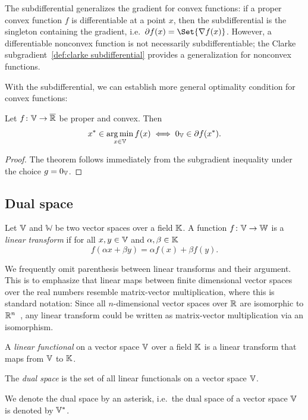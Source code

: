 The subdifferential generalizes the gradient for convex functions:
if a proper convex function \( f \) is differentiable at a point \( x \), then the subdifferential is the singleton containing the gradient, i.e.\ \( \Subdifferential f(x) = \Set{\Grad f(x)} \).
However, a differentiable nonconvex function is not necessarily subdifferentiable; the Clarke subgradient~\cref{def:clarke subdifferential} provides a generalization for nonconvex functions.

With the subdifferential, we can establish more general optimality condition for convex functions:
\begin{theorem}
	Let \( f \colon \mathbb{V} \to \overline{\mathbb{R}} \) be proper and convex.
	Then
	\[
		{x}^\ast \in \operatorname*{arg\,min}_{x \in \mathbb{V}} f(x) \iff \num{0}_{\mathbb{V}} \in \partial f({x}^\ast).
	\]
\end{theorem}
\begin{proof}
	The theorem follows immediately from the subgradient inequality under the choice \( g = \num{0}_{\mathbb{V}} \).
\end{proof}
\subsection{Dual space}
\begin{definition}%
	\label{def:linear transform}
	Let \( \mathbb{V} \) and \( \mathbb{W} \) be two vector spaces over a field \( \mathbb{K} \).
	A function \( f \colon \mathbb{V} \to \mathbb{W} \) is a \emph{linear transform} if for all \( x, y \in \mathbb{V} \) and \( \alpha, \beta \in \mathbb{K} \)
	\[
		f(\alpha x + \beta y) = \alpha f(x) + \beta f(y).
	\]
\end{definition}
\begin{remark}
	We frequently omit parenthesis between linear transforms and their argument.
	This is to emphasize that linear maps between finite dimensional vector spaces over the real numbers resemble matrix-vector multiplication, where this is standard notation:
	Since all \( n \)-dimensional vector spaces over \( \mathbb{R} \) are isomorphic to \( \mathbb{R}^n \)~\cite[theorem 3.70]{Axler2023-ki}, any linear transform could be written as matrix-vector multiplication via an isomorphism.
\end{remark}
\begin{definition}%
	\label{def:linear functional}
	A \emph{linear functional} on a vector space \( \mathbb{V} \) over a field \( \mathbb{K} \) is a linear transform that maps from \( \mathbb{V} \) to \( \mathbb{K} \).
\end{definition}
\begin{definition}%
	\label{def:dual space}
	The \emph{dual space} is the set of all linear functionals on a vector space \( \mathbb{V} \).
\end{definition}
We denote the dual space by an asterisk, i.e.\ the dual space of a vector space \( \mathbb{V} \) is denoted by \( \mathbb{V}^{\ast} \).

